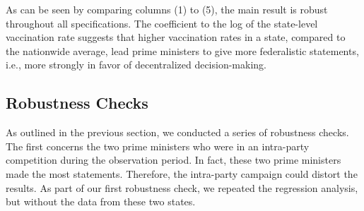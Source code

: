\documentclass[12pt, abstracton]{scrartcl}
\begin{document}
As can be seen by comparing columns (1) to (5), the main result is robust throughout all specifications.  The coefficient to the log of the state-level vaccination rate suggests that higher vaccination rates in a state, compared to the nationwide average, lead prime ministers to give more federalistic statements, i.e., more strongly in favor of decentralized decision-making.



\subsection{Robustness Checks}
As outlined in the previous section, we conducted a series of robustness checks. The first concerns the two prime ministers who were in an intra-party competition during the observation period. In fact, these two prime ministers made the most statements. Therefore, the intra-party campaign could distort the results. As part of our first robustness check, we repeated the regression analysis, but without the data from these two states.
\end{document}
